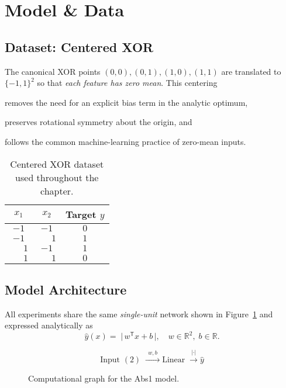 ﻿%
\section{Model \& Data}
\label{sec:abs1-model-data}

\subsection*{Dataset: Centered XOR}
The canonical XOR points \((0,0),(0,1),(1,0),(1,1)\) are translated to
\(\{-1,1\}^2\) so that \emph{each feature has zero mean}.  
This centering

\begin{enumerate*}[label=(\roman*)]
  \item removes the need for an explicit bias term in the analytic optimum,
  \item preserves rotational symmetry about the origin, and
  \item follows the common machine-learning practice of zero-mean inputs.
\end{enumerate*}

\begin{table}[h]
\centering
\caption{Centered XOR dataset used throughout the chapter.}
\label{tab:xor-data}
\begin{tabular}{@{}cc|c@{}}\toprule
$x_1$ & $x_2$ & Target $y$ \\ \midrule
$-1$ & $-1$ & $0$ \\
$-1$ & $\;\phantom{-}1$ & $1$ \\
$\;\phantom{-}1$ & $-1$ & $1$ \\
$\;\phantom{-}1$ & $\;\phantom{-}1$ & $0$ \\ \bottomrule
\end{tabular}
\end{table}

\subsection*{Model Architecture}
All experiments share the same \emph{single-unit} network shown in
Figure~\ref{fig:model-graph} and expressed analytically as
\begin{equation}
    \hat y(x)
    =\;
    \bigl\lvert\,w^{\mathsf T}x + b\,\bigr\rvert,
    \quad
    w \in \mathbb{R}^{2},\;
    b \in \mathbb{R}.
    \label{eq:abs1}
\end{equation}

\begin{figure}[h]
\centering
\[
    \text{Input }(2)
    \;\xrightarrow{\;\,w,b\,\;}
    \text{Linear}
    \;\xrightarrow{\;|\cdot|\;}
    \hat y
\]
\caption{Computational graph for the Abs1 model.}
\label{fig:model-graph}
\end{figure}

